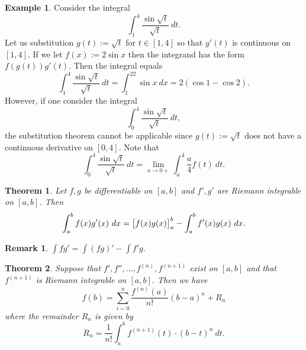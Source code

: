 \documentclass[12pt,openany]{book}
\newtheorem{theorem}{Theorem}[chapter]
\theoremstyle{definition}
\newtheorem{remark}{Remark}[chapter]
\newtheorem{example}{Example}[chapter]
\begin{document}
	\newpage
	\begin{example}
		Consider the integral \[
		\int_1^4\frac{\sin\sqrt{t}}{\sqrt{t}}\ dt.
		\] Let us substitution $g(t):=\sqrt{t}$ for $t\in[1,4]$ so that $g'(t)$ is continuous on $[1,4]$. If we let $f(x):=2\sin x$ then the integrand has the form $f(g(t))g'(t)$. Then the integral equals \[
		\int_1^4\frac{\sin\sqrt{t}}{\sqrt{t}}\ dt=\int_1^22\sin x\ dx=2(\cos 1-\cos 2).
		\] However, if one consider the integral \[
		\int_0^4\frac{\sin\sqrt{t}}{\sqrt{t}}\ dt,
		\] the substitution theorem cannot be applicable since $g(t):=\sqrt{t}$ does not have a continuous derivative on $[0,4]$. Note that \[
		\int_0^4\frac{\sin\sqrt{t}}{\sqrt{t}}\ dt=\lim\limits_{a\to 0+}\int_a^4\frac{a}{4}f(t)\ dt.
		\]
	\end{example}
	\vspace{20pt}
	\begin{tcolorbox}[colframe=thmcolor, title={\color{white}\bf Integration by Parts}]
		\begin{theorem}
			Let $f,g$ be differentiable on $[a,b]$ and $f',g'$ are Riemann integrable on $[a,b]$. Then \[
			\int_a^bf(x)g'(x)\ dx=\sbr{f(x)g(x)}_a^b-\int_a^bf'(x)g(x)\ dx.
			\]
		\end{theorem}
	\end{tcolorbox}
	\begin{remark}
		$\int fg'=\int(fg)'-\int f'g$.
	\end{remark}
	\vspace{20pt}
	\begin{tcolorbox}[colframe=thmcolor, title={\color{white}\bf Taylor's Theorem with the Remainder}]
		\begin{theorem}
			Suppose that $f',f'',\dots,f^{(n)},f^{(n+1)}$ exist on $[a,b]$ and that $f^{(n+1)}$ is Riemann integrable on $[a,b]$. Then we have \[
			f(b)=\sum_{i=0}^n\frac{f^{(n)}(a)}{n!}(b-a)^n+R_n
			\] where the remainder $R_n$ is given by \[
			R_n=\frac{1}{n!}\int_a^bf^{(n+1)}(t)\cdot(b-t)^n\ dt.
			\]
		\end{theorem}
	\end{tcolorbox}

	\newpage
\end{document}
